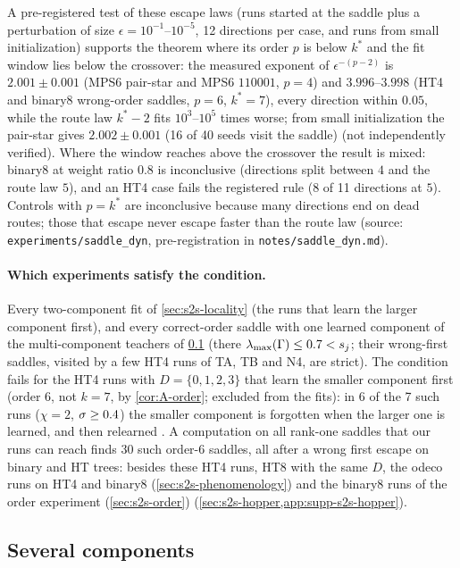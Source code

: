 A pre-registered test of these escape laws (runs started at the saddle plus a perturbation of size
$\epsilon=10^{-1}$--$10^{-5}$, 12 directions per case, and runs from small initialization) supports the theorem where
its order $p$ is below $k^*$ and the fit window lies below the crossover: the measured exponent of $\epsilon^{-(p-2)}$
is $2.001\pm0.001$ (MPS6 pair-star and MPS6 $110001$, $p=4$) and $3.996$--$3.998$ (HT4 and binary8 wrong-order
saddles, $p=6$, $k^*=7$), every direction within $0.05$, while the route law $k^*-2$ fits $10^3$--$10^5$ times worse;
from small initialization the pair-star gives $2.002\pm0.001$ (16 of 40 seeds visit the saddle) \empirical{}
(not independently verified). Where the window reaches above the crossover the result is mixed: binary8 at
weight ratio $0.8$ is inconclusive (directions split between $4$ and the route law $5$), and an HT4 case fails the
registered rule (8 of 11 directions at $5$). Controls with $p=k^*$ are inconclusive because many directions end on
dead routes; those that escape never escape faster than the route law (source: \texttt{experiments/saddle\_dyn},
pre-registration in \texttt{notes/saddle\_dyn.md}).

\paragraph{Which experiments satisfy the condition.}
Every two-component fit of \cref{sec:s2s-locality} (the runs that learn the larger component first), and every
correct-order saddle with one learned component of the multi-component teachers of \cref{sec:s2s-several} (there
$\lambda_{\max}(\Gamma)\le0.7<s_{j}$; their wrong-first saddles, visited by a few HT4 runs of TA, TB and N4, are
strict). The condition fails for the HT4 runs with $D=\{0,1,2,3\}$ that learn the smaller component first (order
$6$, not $k=7$, \proven{} by \cref{cor:A-order}; excluded from the fits): in 6 of the 7 such runs ($\chi=2$,
$\sigma\ge0.4$) the smaller component is forgotten when the larger one is learned, and then relearned \empirical. A
computation on all rank-one saddles that our runs can reach finds 30 such order-6 saddles, all after a wrong first
escape on binary and HT trees: besides these HT4 runs, HT8 with the same $D$, the odeco runs on HT4 and binary8
(\cref{sec:s2s-phenomenology}) and the binary8 runs of the order experiment (\cref{sec:s2s-order}) \empirical{}
(\cref{sec:s2s-hopper,app:supp-s2s-hopper}).

\subsection{Several components}\label{sec:s2s-several}

